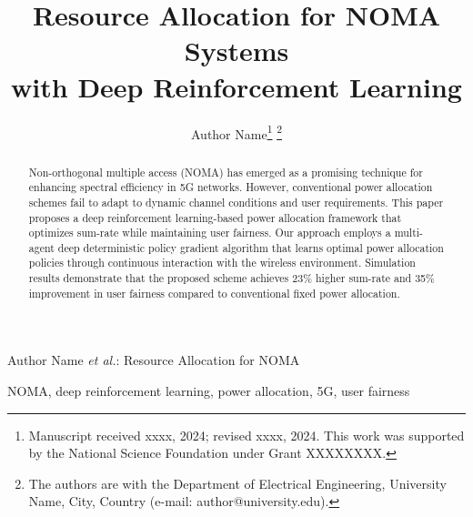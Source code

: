 \documentclass[journal]{IEEEtran}
\begin{document}

\title{Resource Allocation for NOMA Systems\\with Deep Reinforcement Learning}

\author{Author Name\thanks{Manuscript received xxxx, 2024; revised xxxx, 2024. This work was supported by the National Science Foundation under Grant XXXXXXXX.}%
\thanks{The authors are with the Department of Electrical Engineering, University Name, City, Country (e-mail: author@university.edu).}
}

%
{Author Name \MakeLowercase{\textit{et al.}}: Resource Allocation for NOMA}


\maketitle


\begin{abstract}
Non-orthogonal multiple access (NOMA) has emerged as a promising technique for
enhancing spectral efficiency in 5G networks. However, conventional power
allocation schemes fail to adapt to dynamic channel conditions and user
requirements. This paper proposes a deep reinforcement learning-based power
allocation framework that optimizes sum-rate while maintaining user fairness.
Our approach employs a multi-agent deep deterministic policy gradient algorithm
that learns optimal power allocation policies through continuous interaction
with the wireless environment. Simulation results demonstrate that the proposed
scheme achieves 23\% higher sum-rate and 35\% improvement in user fairness
compared to conventional fixed power allocation.
\end{abstract}

\begin{IEEEkeywords}
NOMA, deep reinforcement learning, power allocation, 5G, user fairness
\end{IEEEkeywords}
\end{document}
